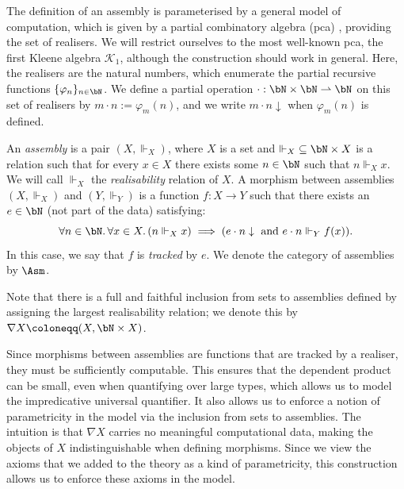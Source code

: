 The definition of an assembly is parameterised by a general model of computation, which is given by a partial combinatory algebra (pca) \cite{feferman}, providing the set of realisers. We will restrict ourselves to the most well-known pca, the first Kleene algebra \( \mathcal{K}_1 \), although the construction should work in general.
Here, the realisers are the natural numbers, which enumerate the partial recursive functions \(\{\varphi_n\}_{n \in \bN} \).  We define a partial operation \( \cdot : \bN \times \bN \rightharpoonup \bN \) on this set of realisers by \( m \cdot n := \varphi_m(n) \), and we write \( {m \cdot n \downarrow} \) when \( \varphi_m(n) \) is defined. 
\begin{definition}
    An \emph{assembly} is a pair $(X, \Vdash_X)$, where $X$ is a set and ${\Vdash_X} \subseteq \bN \times X$ is a relation such that for every \( x \in X \) there exists some \( n \in \bN \) such that \( n \Vdash_X x \). We will call \( \Vdash_X \) the \emph{realisability} relation of \( X \). A morphism between assemblies \((X, \Vdash_X)\) and \( (Y, \Vdash_Y) \) is a function \( f : X \to  Y \) such that there exists an \( e \in \bN \) (not part of the data) satisfying:
\[
    \forall n \in \bN.\,\forall x \in X.\,(n \Vdash_X x) \implies (e \cdot n \downarrow \mbox{ and } e \cdot n \Vdash_Y f(x)).
\] 
In this case, we say that \(f\) is \emph{tracked} by \(e\). We denote the category of assemblies by \( \Asm \).
\end{definition}
Note that there is a full and faithful inclusion from sets to assemblies defined by assigning the largest realisability relation; we denote this by \( \nabla X \coloneqq (X, \bN \times X) \). 

Since morphisms between assemblies are functions that are tracked by a realiser, they must be sufficiently computable.
This ensures that the dependent product can be small, even when quantifying over large types, which allows us to model the impredicative universal quantifier.
It also allows us to enforce a notion of parametricity in the model via the inclusion from sets to assemblies. The intuition is that \( \nabla X \) carries no meaningful computational data, making the objects of \( X \) indistinguishable when defining morphisms. Since we view the axioms that we added to the theory as a kind of parametricity, this construction allows us to enforce these axioms in the model. 

